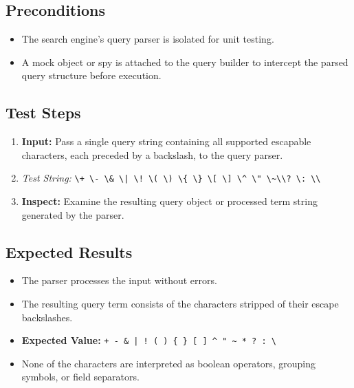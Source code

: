 \documentclass{article}
\begin{document}
\subsection*{Preconditions}
\begin{itemize}
    \item The search engine's query parser is isolated for unit testing.
    \item A mock object or spy is attached to the query builder to intercept the parsed query structure before execution.
\end{itemize}

\subsection*{Test Steps}
\begin{enumerate}
    \item \textbf{Input:} Pass a single query string containing all supported escapable characters, each preceded by a backslash, to the query parser.
    \item[] \textit{Test String:} 
    \texttt{\textbackslash+ \textbackslash- \textbackslash\& \textbackslash| \textbackslash! \textbackslash( \textbackslash) \textbackslash\{ \textbackslash\} \textbackslash[ \textbackslash] \textbackslash\^{} \textbackslash" \textbackslash\textasciitilde \textbackslash* \textbackslash? \textbackslash: \textbackslash\textbackslash}
    \item \textbf{Inspect:} Examine the resulting query object or processed term string generated by the parser.
\end{enumerate}

\subsection*{Expected Results}
\begin{itemize}
    \item The parser processes the input without errors.
    \item The resulting query term consists of the characters stripped of their escape backslashes.
    \item \textbf{Expected Value:} \texttt{+ - \& | ! ( ) \{ \} [ ] \^{} " \textasciitilde{} * ? : \textbackslash}
    \item None of the characters are interpreted as boolean operators, grouping symbols, or field separators.
\end{itemize}
\end{document}
